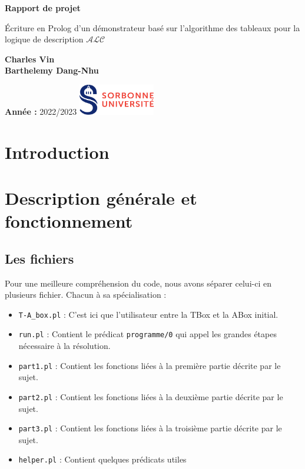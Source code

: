 \documentclass[12pt]{article}
\begin{document}
\begin{titlepage}
    \begin{center}
        \vspace*{1cm}

        \Huge
        \textbf{Rapport de projet}

        \vspace{0.5cm}
        \LARGE
        Écriture en Prolog d'un démonstrateur basé sur l'algorithme des tableaux pour la logique de description  $ \mathcal{ALC}$

        \vspace{1.5cm}

        \textbf{Charles Vin}\\
        \textbf{Barthelemy Dang-Nhu}

        \vfill



        \normalsize

        \textbf{Année :}
        2022/2023
        \hfill
        \includegraphics[width=0.25\textwidth]{./src/logo.png}
    \end{center}
\end{titlepage}

\tableofcontents
\newpage

\section{Introduction}

\section{Description générale et fonctionnement}
\subsection{Les fichiers}
Pour une meilleure compréhension du code, nous avons séparer celui-ci en plusieurs fichier. Chacun à sa spécialisation : \begin{itemize}
    \item \verb|T-A_box.pl| : C'est ici que l'utilisateur entre la TBox et la ABox initial.
    \item \verb|run.pl| : Contient le prédicat \verb|programme/0|  qui appel les grandes étapes nécessaire à la résolution.
    \item \verb|part1.pl| : Contient les fonctions liées à la première partie décrite par le sujet.
    \item \verb|part2.pl| : Contient les fonctions liées à la deuxième partie décrite par le sujet.
    \item \verb|part3.pl| : Contient les fonctions liées à la troisième partie décrite par le sujet.
    \item \verb|helper.pl| : Contient quelques prédicats utiles
\end{itemize}
\end{document}

